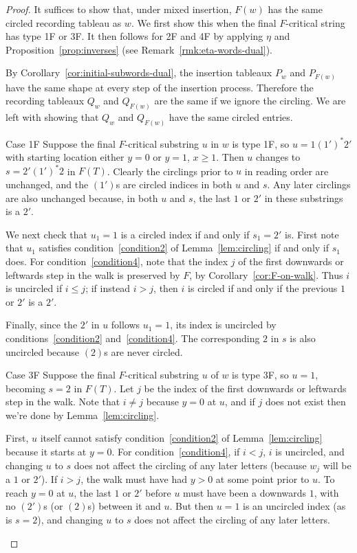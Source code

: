 \documentclass[ALCO,ThmDefs,Unicode,epreuves]{cedram}
\begin{document}
\begin{proof}
It suffices to show that, under mixed insertion, $F(w)$ has the same circled recording tableau as $w$. We first show this when the final $F$-critical string has type 1F or 3F. It then follows for 2F and 4F by applying $\eta$ and Proposition~\ref{prop:inverses} (see Remark~\ref{rmk:eta-words-dual}).

By Corollary~\ref{cor:initial-subwords-dual}, the insertion tableaux $P_{w}$ and $P_{F(w)}$ have the same shape at every step of the insertion process. Therefore the recording tableaux $Q_{w}$ and $Q_{F(w)}$ are the same if we ignore the circling. We are left with showing that $Q_{w}$ and $Q_{F(w)}$ have the same circled entries.


\begin{enonce*}[remark]{Case 1F} Suppose the final $F$-critical substring $u$ in $w$ is type 1F, so $u=1(1')^\ast 2'$ with starting location either $y=0$ or $y=1$, $x\ge 1$. Then $u$ changes to $s=2'(1')^\ast 2$ in $F(T)$. Clearly the circlings prior to $u$ in reading order are unchanged, and the $(1')$s are circled indices in both $u$ and $s$. Any later circlings are also unchanged because, in both $u$ and $s$, the last $1$ or $2'$ in these substrings is a $2'$.

We next check that $u_1=1$ is a circled index if and only if $s_1=2'$ is. First note that $u_1$ satisfies condition~\ref{condition2} of Lemma~\ref{lem:circling} if and only if $s_1$ does. For condition~\ref{condition4}, note that the index $j$ of the first downwards or leftwards step in the walk is preserved by $F$, by Corollary~\ref{cor:F-on-walk}. Thus $i$ is uncircled if $i \leq j$; if instead $i > j$, then $i$ is circled if and only if the previous $1$ or $2'$ is a $2'$.

Finally, since the $2'$ in $u$ follows $u_1=1$, its index is uncircled by conditions~\ref{condition2} and~\ref{condition4}. The corresponding $2$ in $s$ is also uncircled because $(2)$s are never circled.
\end{enonce*}

\begin{enonce*}[remark]{Case 3F} Suppose the final $F$-critical substring $u$ of $w$ is type 3F, so $u=1$, becoming $s=2$ in $F(T)$. Let $j$ be the index of the first downwards or leftwards step in the walk. Note that $i \ne j$ because $y=0$ at $u$, and if $j$ does not exist then we're done by Lemma~\ref{lem:circling}.

First, $u$ itself cannot satisfy condition~\ref{condition2} of Lemma~\ref{lem:circling} because it starts at $y=0$. For condition~\ref{condition4}, if $i < j$, $i$ is uncircled, and changing $u$ to $s$ does not affect the circling of any later letters (because $w_j$ will be a $1$ or $2'$). If $i > j$, the walk must have had $y>0$ at some point prior to $u$. To reach $y=0$ at $u$, the last $1$ or $2'$ before $u$ must have been a downwards $1$, with no $(2')$s (or $(2)$s) between it and $u$. But then $u=1$ is an uncircled index (as is $s=2$), and changing $u$ to $s$ does not affect the circling of any later letters.\qedhere
\end{enonce*}
\end{proof}
\end{document}
